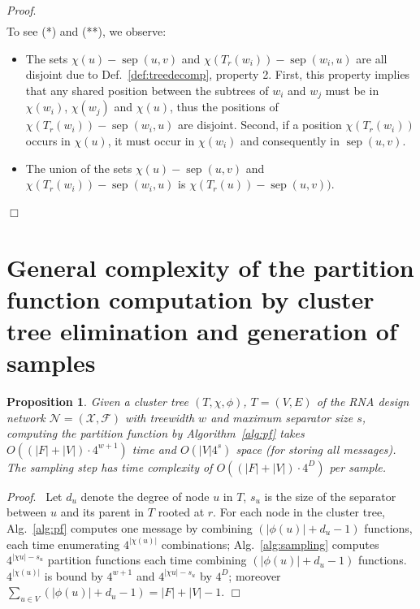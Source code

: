 \documentclass[10pt]{article}
\newtheorem{proposition}[theorem]{Proposition}
\newenvironment{proof}[1][]{\noindent \emph{Proof}\ifthenelse{\equal{#1}{}}{}{ (#1)}.~}{\hfill$\Box$}
\newcommand{\network}{\mathcal{N}}
\newcommand{\separator}[2]{\operatorname{sep}(#1,#2)}
\newcommand{\F}{\mathcal{F}}
\newcommand{\X}{\mathcal{X}}
\begin{document}
\begin{proof}
\begin{align*}
\end{align*}
To see (*) and (**), we observe:
\begin{itemize}
\item The sets $\chi(u)-\separator{u}{v}$ and
  $\chi(T_r(w_i))-\separator{w_i}{u}$ are all disjoint due to
  Def.~\ref{def:treedecomp}, property 2. First, this property implies
  that any shared position between the subtrees of $w_i$ and $w_j$
  must be in $\chi(w_i)$, $\chi(w_j)$ and $\chi(u)$, thus the
  positions of $\chi(T_r(w_i))-\separator{w_i}{u}$ are
  disjoint. Second, if a position $\chi(T_r(w_i))$ occurs in
  $\chi(u)$, it must occur in $\chi(w_i)$ and consequently in $\separator{u}{v}$.
\item The union of the sets $\chi(u)-\separator{u}{v}$ and
  $\chi(T_r(w_i))-\separator{w_i}{u}$ is $\chi(T_r(u))-\separator{u}{v}).$
\end{itemize}

\end{proof}

\section{General complexity of the partition function computation by cluster tree elimination and generation of samples}
\label{appsec:algcomplexity}

\begin{proposition}
  \label{prop:general-complexity}
Given a cluster tree $(T,\chi,\phi)$, $T=(V,E)$ of the RNA design network $\network=(\X,\F)$ with treewidth $w$ and maximum separator size $s$, computing the partition function by Algorithm~\ref{alg:pf} takes $O((|F|+|V|)\cdot 4^{w+1})$ time and $O(|V| 4^s)$ space (for storing all messages). The sampling step has time complexity of $O((|F|+|V|)\cdot 4^D)$ per sample.
\end{proposition}

\begin{proof}[Proposition~\ref{prop:general-complexity}]
Let $d_u$ denote the degree of node $u$ in $T$, $s_u$ is the size of the separator between
$u$ and its parent in $T$ rooted at $r$. For each node in the cluster tree, Alg.~\ref{alg:pf} computes one message by combining $(|\phi(u)|+d_u-1)$ functions, each time enumerating $4^{|\chi(u)|}$ combinations; Alg.~\ref{alg:sampling} computes $4^{|\chi{u}|-s_u}$ partition functions each time combining $(|\phi(u)|+d_u-1)$ functions.  $4^{|\chi(u)|}$ is bound by $4^{w+1}$ and $4^{|\chi{u}|-s_u}$ by $4^D$; moreover $\sum_{u\in V} (|\phi(u)|+d_u-1) = |F|+|V|-1$.
\end{proof}
\end{document}
